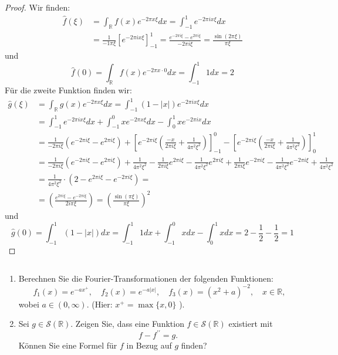 \documentclass[11pt]{article}
\newcommand{\R}{\mathbb{R}}
\newenvironment{problem}[2][Beispiel]{
    \begin{trivlist}
        \item[\hskip \labelsep {\bfseries #1}\hskip \labelsep {\bfseries #2.}] \itshape}{
    \end{trivlist}\normalshape
}
\begin{document}
    \begin{proof}
        Wir finden:
        $$\begin{aligned}
              \hat{f}(\xi) &= \int_{\R} f(x) e^{-2\pi x\xi} dx = \int_{-1}^1 e^{-2\pi ix\xi}dx \\
              &= \frac{1}{-1\pi \xi}[e^{-2\pi ix\xi}]_{-1}^1 = \frac{e^{-2\pi i\xi}-e^{2\pi i\xi}}{-2
              \pi i\xi} = \frac{\sin (2 \pi \xi)}{\pi \xi}
        \end{aligned}$$
        und
        $$\hat{f}(0)= \int_{\R} f(x) e^{-2\pi x\cdot 0} dx = \int_{-1}^1 1dx=2$$
        Für die zweite Funktion finden wir:
        $$\begin{aligned}
              \hat{g}(\xi) &= \int_{\R} g(x) e^{-2\pi x\xi} dx = \int_{-1}^1 (1-|x|) e^{-2\pi ix\xi}dx\\
              &= \int_{-1}^1e^{-2\pi ix\xi}dx + \int_{-1}^0 xe^{-2\pi x\xi}dx -\int_0^1 xe^{-2\pi ix}dx \\
              &= \frac{1}{-2\pi i\xi}(e^{-2\pi i\xi}-e^{2\pi i\xi}) +
              \left[e^{-2\pi i\xi}\left(\frac{-x}{2\pi i\xi}+\frac{1}{4\pi^2 \xi^2}\right)\right]_{-1}^0-
              \left[e^{-2\pi i\xi}\left(\frac{-x}{2\pi i\xi}+\frac{1}{4\pi^2 \xi^2}\right)\right]_0^1\\
              &= \frac{1}{-2\pi i\xi}(e^{-2\pi i\xi}-e^{2\pi i\xi})+\frac{1}{4\pi^2 \xi^2} - 
              \frac{1}{2\pi i\xi}e^{2\pi i\xi}-\frac{1}{4\pi^2\xi^2}e^{2\pi i\xi}+\frac{1}{2\pi i\xi}e^{-2\pi i\xi} -
              \frac{1}{4\pi^2\xi^2}e^{-2\pi i\xi}+\frac{1}{4\pi^2 \xi^2}\\
              &= \frac{1}{4\pi^2 \xi^2}\cdot\left(2-e^{2\pi i\xi}-e^{-2\pi i\xi}\right) = \\
              &= \left(\frac{e^{2\pi i\xi}-e^{-2\pi i\xi}}{2i\pi\xi}\right) =
              \left(\frac{\sin (\pi \xi)}{\pi \xi}\right)^2
        \end{aligned}$$
        und
        $$\hat{g}(0)= \int_{-1}^1 (1-|x|)dx=\int_{-1}^1 1dx+\int_{-1}^0 x dx -\int_{0}^1 xdx
        =2 -\frac{1}{2}-\frac{1}{2} = 1 $$
    \end{proof}

    \begin{problem}{2}
        $\quad$
        \begin{enumerate}[label = (\roman{enumi})]
            \item Berechnen Sie die Fourier-Transformationen der folgenden Funktionen:
            $$
            f_1(x)=e^{-a x^{+}}, \quad f_2(x)=e^{-a|x|}, \quad f_3(x)=\left(x^2+a
            \right)^{-2}, \quad x \in \mathbb{R},
            $$
            wobei $a \in(0, \infty)$. (Hier: $x^{+}=\max \{x, 0\}$ ).
            \item Sei $g \in \mathcal{S}(\mathbb{R})$. Zeigen Sie, dass eine
            Funktion $f \in \mathcal{S}(\mathbb{R})$ existiert mit
            $$
            f-f^{\prime \prime}=g \text {. }
            $$
            Können Sie eine Formel für $f$ in Bezug auf $g$ finden?
        \end{enumerate}
    \end{problem}
\end{document}
